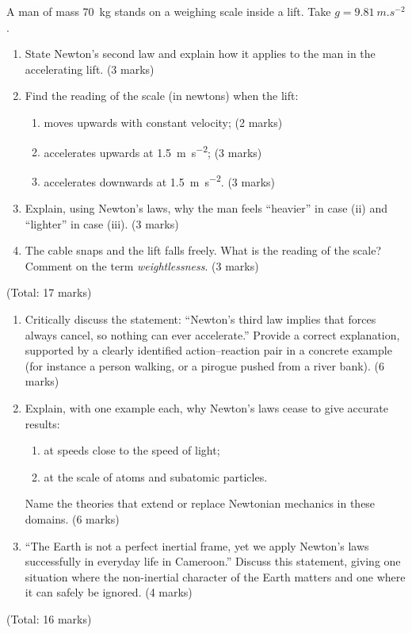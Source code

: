 \documentclass[11pt]{article}
\begin{document}
\begin{exercice}
A man of mass \SI{70}{kg} stands on a weighing scale inside a lift. Take $g = \SI{9.81}{m.s^{-2}}$.
\begin{enumerate}
\item State Newton's second law and explain how it applies to the man in the accelerating lift. \hfill (3 marks)
\item Find the reading of the scale (in newtons) when the lift:
\begin{enumerate}
\item moves upwards with constant velocity; \hfill (2 marks)
\item accelerates upwards at \SI{1.5}{m.s^{-2}}; \hfill (3 marks)
\item accelerates downwards at \SI{1.5}{m.s^{-2}}. \hfill (3 marks)
\end{enumerate}
\item Explain, using Newton's laws, why the man feels ``heavier'' in case (ii) and ``lighter'' in case (iii). \hfill (3 marks)
\item The cable snaps and the lift falls freely. What is the reading of the scale? Comment on the term \emph{weightlessness}. \hfill (3 marks)
\end{enumerate}
\hfill (Total: 17 marks)
\end{exercice}

\begin{exercice}
\begin{enumerate}
\item Critically discuss the statement: ``Newton's third law implies that forces always cancel, so nothing can ever accelerate.'' Provide a correct explanation, supported by a clearly identified action--reaction pair in a concrete example (for instance a person walking, or a pirogue pushed from a river bank). \hfill (6 marks)
\item Explain, with one example each, why Newton's laws cease to give accurate results:
\begin{enumerate}
\item at speeds close to the speed of light;
\item at the scale of atoms and subatomic particles.
\end{enumerate}
Name the theories that extend or replace Newtonian mechanics in these domains. \hfill (6 marks)
\item ``The Earth is not a perfect inertial frame, yet we apply Newton's laws successfully in everyday life in Cameroon.'' Discuss this statement, giving one situation where the non-inertial character of the Earth matters and one where it can safely be ignored. \hfill (4 marks)
\end{enumerate}
\hfill (Total: 16 marks)
\end{exercice}
\end{document}
